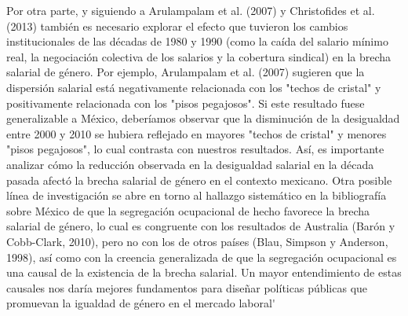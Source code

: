 Por otra parte, y siguiendo a Arulampalam et al. (2007) y Christofides et al. (2013) tambi\'en es necesario explorar el efecto que tuvieron los cambios institucionales de las d\'ecadas de 1980 y 1990 (como la ca\'ida del salario m\'inimo real, la negociaci\'on colectiva de los salarios y la cobertura sindical) en la brecha salarial de g\'enero. Por ejemplo, Arulampalam et al. (2007) sugieren que la dispersi\'on salarial está negativamente relacionada con los "techos de cristal" y positivamente relacionada con los "pisos pegajosos". Si este resultado fuese generalizable a M\'exico, deber\'iamos observar que la disminuci\'on de la desigualdad entre 2000 y 2010 se hubiera reflejado en mayores "techos de cristal" y menores "pisos pegajosos", lo cual contrasta con nuestros resultados. As\'i, es importante analizar c\'omo la reducci\'on observada en la desigualdad salarial en la d\'ecada pasada afect\'o la brecha salarial de g\'enero en el contexto mexicano. Otra posible l\'inea de investigaci\'on se abre en torno al hallazgo sistemático en la bibliograf\'ia sobre M\'exico de que la segregaci\'on ocupacional de hecho favorece la brecha salarial de g\'enero, lo cual es congruente con los resultados de Australia (Bar\'on y Cobb-Clark, 2010), pero no con los de otros pa\'ises (Blau, Simpson y Anderson, 1998), as\'i como con la creencia generalizada de que la segregaci\'on ocupacional es una causal de la existencia de la brecha salarial. Un mayor entendimiento de estas causales nos dar\'ia mejores fundamentos para dise\~nar pol\'iticas p\'ublicas que promuevan la igualdad de g\'enero en el mercado laboral\'
